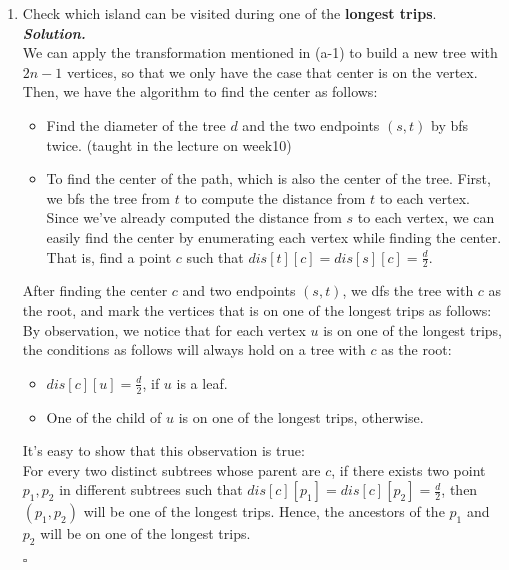 \documentclass[12pt, a4paper, UTF8]{article}
\newenvironment{solution}[1][\it{Solution}]{\textbf{#1. }\\}{\begin{flushright}$\square$\end{flushright}}
\newenvironment{claim}[1][\it{Claim}]{
    \begin{center}
        \begin{tabular}{|p{0.9\textwidth}|}
    \hline\\
    \textbf{#1. }\\
}{
    \\\\\hline
        \end{tabular}
    \end{center}
}
\begin{document}
\begin{enumerate}
\begin{solution}
\begin{claim}
\begin{flushright}
                    \end{flushright}
                \end{claim}
                Since all the longest trips have the same center, it's trivial that they will meet at the center of the tree.
            \end{solution}
        \item Check which island can be visited during one of the \textbf{longest trips}.\\
            \begin{solution}
                We can apply the transformation mentioned in (a-1) to build a new tree with $2n - 1$ vertices, so that we only have the case that center is on the vertex.\\
                Then, we have the algorithm to find the center as follows:\\
                \begin{itemize}
                    \item Find the diameter of the tree $d$ and the two endpoints $(s, t)$ by bfs twice. (taught in the lecture on week10)
                    \item To find the center of the path, which is also the center of the tree. First, we bfs the tree from $t$ to compute the distance from $t$ to each vertex. Since we've already computed the distance from $s$ to each vertex, we can easily find the center by enumerating each vertex while finding the center. That is, find a point $c$ such that $dis[t][c] = dis[s][c] = \frac{d}{2}$.
                \end{itemize}
                After finding the center $c$ and two endpoints $(s, t)$, we dfs the tree with $c$ as the root, and mark the vertices that is on one of the longest trips as follows:\\
                By observation, we notice that for each vertex $u$ is on one of the longest trips, the conditions as follows will always hold on a tree with $c$ as the root: 
                \begin{itemize}
                    \item $dis[c][u] = \frac{d}{2}$, if $u$ is a leaf.
                    \item One of the child of $u$ is on one of the longest trips, otherwise.
                \end{itemize}
                It's easy to show that this observation is true:\\
                For every two distinct subtrees whose parent are $c$, if there exists two point $p_1, p_2$ in different subtrees such that $dis[c][p_1] = dis[c][p_2] = \frac{d}{2}$, then $(p_1, p_2)$ will be one of the longest trips. Hence, the ancestors of the $p_1$ and $p_2$ will be on one of the longest trips.\\ 

\end{solution}
\end{enumerate}
\end{document}
